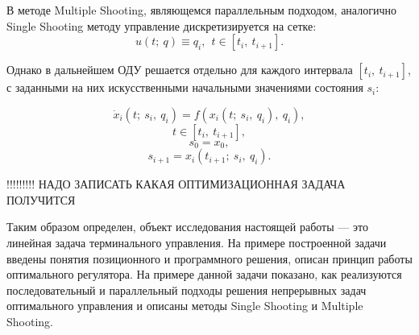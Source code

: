В методе Multiple Shooting, являющемся параллельным подходом, аналогично Single Shooting методу  управление дискретизируется на сетке:
\[u(t;~q) \equiv q_i, ~~ t \in [t_i,~t_{i+1}].\]


Однако в дальнейшем ОДУ решается отдельно для каждого интервала $[t_i,~t_{i+1}]$, с заданными на них искусственными начальными значениями состояния $s_i$:


\[\dot x_i(t;~s_i,~q_i) = f(x_i(t;~s_i,~q_i), ~q_i),\]
\[t \in [t_i,~t_{i+1}],\]
\[s_0 = x_0,\]
\[s_{i+1} = x_i(t_{i+1};~s_i,~q_i).\]

\bigskip
!!!!!!!!! НАДО ЗАПИСАТЬ КАКАЯ ОПТИМИЗАЦИОННАЯ ЗАДАЧА ПОЛУЧИТСЯ

\bigskip



Таким образом определен, объект исследования настоящей работы --- это линейная задача терминального управления. На примере построенной задачи введены понятия позиционного и программного решения, описан принцип работы оптимального регулятора. На примере данной задачи показано, как реализуются последовательный и параллельный подходы решения непрерывных задач оптимального управления и описаны методы  Single Shooting и Multiple Shooting.
